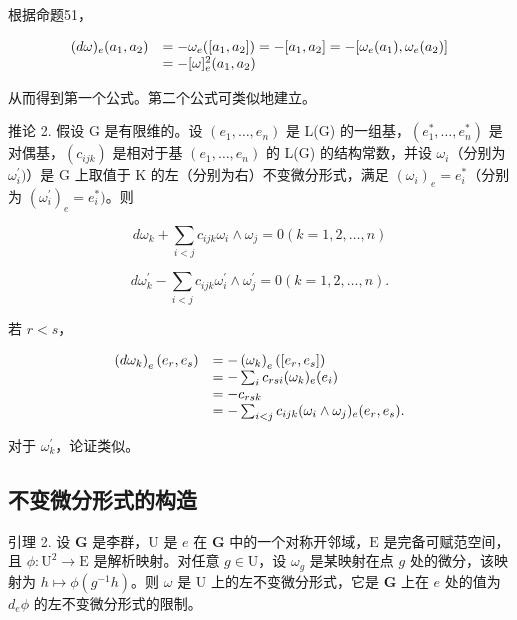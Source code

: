 根据命题51，

\[
\begin{array}{r l} (d \omega) _ {e} (a _ {1}, a _ {2}) & = - \omega_ {e} ([ a _ {1}, a _ {2} ]) = - [ a _ {1}, a _ {2} ] = - [ \omega_ {e} (a _ {1}), \omega_ {e} (a _ {2}) ] \\ & = - [ \omega ] _ {e} ^ {2} (a _ {1}, a _ {2}) \end{array}
\]

从而得到第一个公式。第二个公式可类似地建立。

推论 2. 假设 G 是有限维的。设 \((e_1, \ldots, e_n)\) 是 L(G) 的一组基，\((e_1^*, \ldots, e_n^*)\) 是对偶基，\((c_{ijk})\) 是相对于基 \((e_1, \ldots, e_n)\) 的 L(G) 的结构常数，并设 \(\omega_i\)（分别为 \(\omega_i^{\prime})\)）是 G 上取值于 K 的左（分别为右）不变微分形式，满足 \((\omega_i)_e = e_i^*\)（分别为 \((\omega_i^{\prime})_e = e_i^*)\)。则

\[
d \omega_ {k} + \sum_ {i <   j} c _ {i j k} \omega_ {i} \wedge \omega_ {j} = 0 (k = 1, 2, \dots , n)
\]

\[
d \omega_ {k} ^ {\prime} - \sum_ {i <   j} c _ {i j k} \omega_ {i} ^ {\prime} \wedge \omega_ {j} ^ {\prime} = 0 (k = 1, 2, \dots , n).
\]

若 \(r < s\)，

\[
\begin{array}{r l} \left(d \omega_ {k}\right) _ {e} (e _ {r}, e _ {s}) & = - \left(\omega_ {k}\right) _ {e} ([ e _ {r}, e _ {s} ]) \\ & = - \sum_ {i} c _ {r s i} (\omega_ {k}) _ {e} (e _ {i}) \\ & = - c _ {r s k} \\ & = - \sum_ {i <   j} c _ {i j k} (\omega_ {i} \wedge \omega_ {j}) _ {e} (e _ {r}, e _ {s}). \end{array}
\]

对于 \(\omega_{k}^{\prime}\)，论证类似。

\subsection{不变微分形式的构造}

引理 2. 设 \(\mathbf{G}\) 是李群，\(\mathrm{U}\) 是 \(e\) 在 \(\mathbf{G}\) 中的一个对称开邻域，\(\mathrm{E}\) 是完备可赋范空间，且 \(\phi: \mathrm{U}^2 \to \mathrm{E}\) 是解析映射。对任意 \(g \in \mathrm{U}\)，设 \(\omega_g\) 是某映射在点 \(g\) 处的微分，该映射为 \(h \mapsto \phi(g^{-1}h)\)。则 \(\omega\) 是 \(\mathrm{U}\) 上的左不变微分形式，它是 \(\mathbf{G}\) 上在 \(e\) 处的值为 \(d_e\phi\) 的左不变微分形式的限制。

